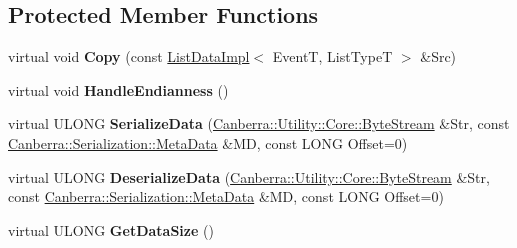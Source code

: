\subsection*{Protected Member Functions}
\begin{DoxyCompactItemize}
\item 
\mbox{\label{class_canberra_1_1_data_types_1_1_spectroscopy_1_1_list_data_impl_a512a1a801e164344b6d1692ea8b8e3d9}} 
virtual void {\bfseries Copy} (const \hyperlink{class_canberra_1_1_data_types_1_1_spectroscopy_1_1_list_data_impl}{List\+Data\+Impl}$<$ EventT, List\+TypeT $>$ \&Src)
\item 
\mbox{\label{class_canberra_1_1_data_types_1_1_spectroscopy_1_1_list_data_impl_a66b294d000609f72d8e96888257bdc87}} 
virtual void {\bfseries Handle\+Endianness} ()
\item 
\mbox{\label{class_canberra_1_1_data_types_1_1_spectroscopy_1_1_list_data_impl_ae3e0536520cfe3f55a69330980a317da}} 
virtual U\+L\+O\+NG {\bfseries Serialize\+Data} (\hyperlink{class_canberra_1_1_utility_1_1_core_1_1_byte_stream}{Canberra\+::\+Utility\+::\+Core\+::\+Byte\+Stream} \&Str, const \hyperlink{class_canberra_1_1_serialization_1_1_meta_data}{Canberra\+::\+Serialization\+::\+Meta\+Data} \&MD, const L\+O\+NG Offset=0)
\item 
\mbox{\label{class_canberra_1_1_data_types_1_1_spectroscopy_1_1_list_data_impl_ae6d30f15733e66c7c3beefd1cb12d5e2}} 
virtual U\+L\+O\+NG {\bfseries Deserialize\+Data} (\hyperlink{class_canberra_1_1_utility_1_1_core_1_1_byte_stream}{Canberra\+::\+Utility\+::\+Core\+::\+Byte\+Stream} \&Str, const \hyperlink{class_canberra_1_1_serialization_1_1_meta_data}{Canberra\+::\+Serialization\+::\+Meta\+Data} \&MD, const L\+O\+NG Offset=0)
\item 
\mbox{\label{class_canberra_1_1_data_types_1_1_spectroscopy_1_1_list_data_impl_a8ab0538f48ffe667979e3c3b812960b8}} 
virtual U\+L\+O\+NG {\bfseries Get\+Data\+Size} ()
\end{DoxyCompactItemize}
